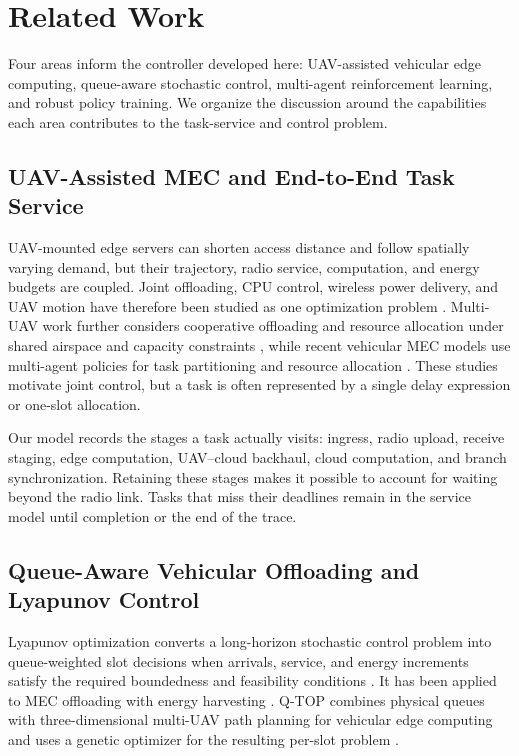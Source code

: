 \section{Related Work}
Four areas inform the controller developed here: UAV-assisted vehicular
edge computing, queue-aware stochastic control, multi-agent reinforcement
learning, and robust policy training. We organize the discussion around the
capabilities each area contributes to the task-service and control problem.

\subsection{UAV-Assisted MEC and End-to-End Task Service}
UAV-mounted edge servers can shorten access distance and follow spatially
varying demand, but their trajectory, radio service, computation, and energy
budgets are coupled. Joint offloading, CPU control, wireless power delivery,
and UAV motion have therefore been studied as one optimization problem
\cite{liu2020uav,xiong2021energy}. Multi-UAV work further considers
cooperative offloading and resource allocation under shared airspace and
capacity constraints \cite{guo2024multi}, while recent vehicular MEC models
use multi-agent policies for task partitioning and resource allocation
\cite{liang2025rav}. These studies motivate joint control, but a task is often
represented by a single delay expression or one-slot allocation.

Our model records the stages a task actually visits: ingress, radio upload,
receive staging, edge computation, UAV--cloud backhaul, cloud computation,
and branch synchronization. Retaining these stages makes it possible to
account for waiting beyond the radio link. Tasks that miss their deadlines
remain in the service model until completion or the end of the trace.

\subsection{Queue-Aware Vehicular Offloading and Lyapunov Control}
Lyapunov optimization converts a long-horizon stochastic control problem into
queue-weighted slot decisions when arrivals, service, and energy increments
satisfy the required boundedness and feasibility conditions
\cite{neely2010stochastic}. It has been applied to MEC offloading with energy
harvesting \cite{mao2017dynamic}. Q-TOP combines physical queues with
three-dimensional multi-UAV path planning for vehicular edge computing and
uses a genetic optimizer for the resulting per-slot problem
\cite{sun2026qtop}.

